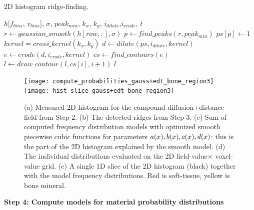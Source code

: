 \begin{algorithm}
    \caption{2D histogram ridge-finding.}
    \label{alg:material}
    \begin{algorithmic}
         {$h[f_{bins}$, $v_{bins}]$, $\sigma$, $peak_{min}$, $k_x$, $k_y$, \newline \indent \indent $i_{dilate}$,$i_{erode}$, $t$}
                \State $r \gets gaussian\_smooth(h[row,:], \sigma)$
                \State $p \gets find\_peaks(r, peak_{min})$
                \State $ps[p] \gets 1$
            \EndFor
            \State $kernel = cross\_kernel(k_x, k_y)$
            \State $d \gets dilate(ps, i_{dilate}, kernel)$
            \State $e \gets erode(d, i_{erode}, kernel)$
            \State $cs \gets find\_contours(e)$
                    \State $l \gets draw\_contour(l, cs[i], i+1)$
                \EndIf
            \EndFor
            \Return $l$
        \EndFunction
    \end{algorithmic}
\end{algorithm}

\begin{figure}
  \centering
  \texttt{[image: compute\_probabilities\_gauss+edt\_bone\_region3]}\\
  \texttt{[image: hist\_slice\_gauss+edt\_bone\_region3]}\\
  \caption{(a) Measured 2D histogram for the compound diffusion+distance field from Step 2. (b)
    The detected ridges from Step 3. (c) Sum of computed frequency distribution models
    with optimized smooth piecewise cubic functions for parameters $a(x), b(x), c(x), d(x)$:
    this is the part of the 2D histogram explained by the smooth model. (d) The individual distributions evaluated
    on the 2D field-value$\times$ voxel-value grid. (e) A single 1D slice of the 2D histogram (black) together with
    the model frequency distributions. Red is soft-tissue, yellow is bone mineral.
  }
  \label{fig:curves-and-more}
\end{figure}

\vspace{\baselineskip}
\noindent\textbf{Step 4: Compute models for material probability distributions} \\


